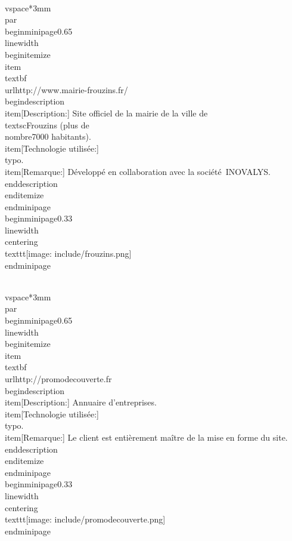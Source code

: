 \documentclass[]{extarticle}
\begin{document}
\\vspace*{3mm}\\par
\\begin{minipage}{0.65\\linewidth}
  \\begin{itemize}
  \\item \\textbf{\\url{http://www.mairie-frouzins.fr/}}
    \\begin{description}
    \\item[Description:] Site officiel de la mairie de la ville de
      \\textsc{Frouzins} (plus de \\nombre{7000} habitants).
    \\item[Technologie utilisée:] \\typo.
    \\item[Remarque:] Développé en collaboration avec la société~INOVALYS.
    \\end{description}
  \\end{itemize}
\\end{minipage}
\\begin{minipage}{0.33\\linewidth}
  \\centering
  \\texttt{[image: include/frouzins.png]}
\\end{minipage}

\\vspace*{3mm}\\par
\\begin{minipage}{0.65\\linewidth}
  \\begin{itemize}
  \\item \\textbf{\\url{http://promodecouverte.fr}}
    \\begin{description}
    \\item[Description:] Annuaire d'entreprises.
    \\item[Technologie utilisée:] \\typo.
    \\item[Remarque:] Le client est entièrement maître de la mise en
      forme du site.
    \\end{description}
  \\end{itemize}
\\end{minipage}
\\begin{minipage}{0.33\\linewidth}
  \\centering
  \\texttt{[image: include/promodecouverte.png]}
\\end{minipage}
\end{document}
